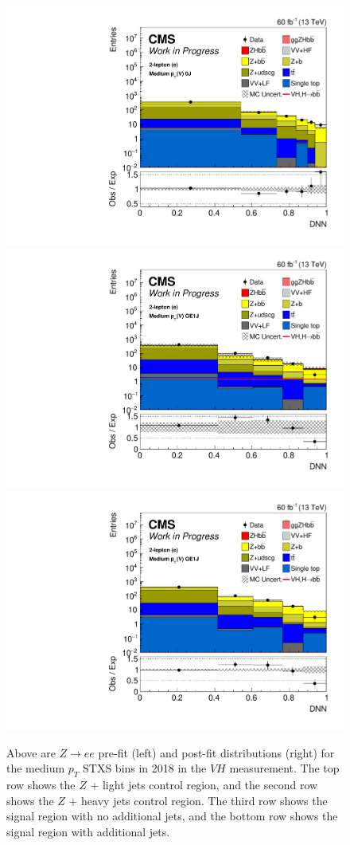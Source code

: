 \begin{figure}
  \includegraphics[width=0.35\linewidth]{figures/210322_STXSfine_400split_unblinded_Xbb_025349b6_postfitplots/plot_shapes_vhbb_Zee_5_13TeV2018_postfit_logy.pdf} \\
  \includegraphics[width=0.35\linewidth]{figures/210411_STXSfine_400split_unblinded_Xbb_8f854f5a_postfitplots/plot_shapes_vhbb_Zee_9_13TeV2018_prefit_logy.pdf}
  \includegraphics[width=0.35\linewidth]{figures/210411_STXSfine_400split_unblinded_Xbb_8f854f5a_postfitplots/plot_shapes_vhbb_Zee_9_13TeV2018_postfit_logy.pdf} \\
  \caption[$Z\rightarrow ee$ $V\!H$ distributions for medium $p_T$ in 2018]{
    Above are $Z\rightarrow ee$ pre-fit (left) and post-fit distributions (right)
    for the medium $p_T$ STXS bins in 2018 in the $V\!H$ measurement.
    The top row shows the $Z$ + light jets control region, and
    the second row shows the $Z$ + heavy jets control region.
    The third row shows the signal region with no additional jets, and
    the bottom row shows the signal region with additional jets.
  }
  \label{fig:vh-zee-med-2018}
\end{figure}

